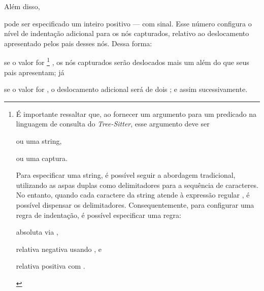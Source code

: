 \documentclass
  [11pt,a4paper,english,brazil,openright,sumario=tradicional,twoside]
  {abntex2}
\newcommand{\treesitter}{\textit{Tree-Sitter}\xspace}
\begin{document}
{{\begin{inparaenum}
          Além disso,
    \item pode ser especificado um inteiro positivo --- com sinal. Esse número
          configura o nível de indentação adicional para os nós capturados,
          relativo ao deslocamento apresentado pelos pais desses nós. Dessa
          forma:
          \begin{inparaenum}
            \item se o valor for %
                  \footnote
                    { É importante ressaltar que, ao fornecer um argumento para
                      um predicado na linguagem de consulta do \treesitter,
                      esse argumento deve ser
                      \begin{inparaenum}[(I)]
                        \item ou uma string,
                        \item ou uma captura.
                      \end{inparaenum}
                      Para especificar uma string, é possível seguir a
                      abordagem tradicional, utilizando as aspas duplas como
                      delimitadores para a sequência de caracteres. No entanto,
                      quando cada caractere da string atende à expressão
                      regular \usebox{\querystringregex}, é possível dispensar
                      os delimitadores. Consequentemente, para configurar uma
                      regra de indentação, é possível especificar uma regra:
                      \begin{inparaenum}[(I)]
                        \item absoluta via \usebox{\indentruleabs},
                        \item relativa negativa usando \usebox{\indentruleneg},
                              e
                        \item relativa positiva com \usebox{\indentrulepos}.
                      \end{inparaenum}}%
                  , os nós capturados
                  serão deslocados mais um 
                  além do que seus pais apresentam; já
            \item se o valor for , o deslocamento
                  adicional será de dois ; e
                  assim sucessivamente.
          \end{inparaenum}


\end{inparaenum}}}
\end{document}
